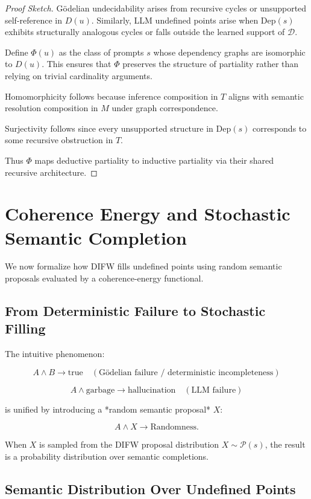 \documentclass{article}
\begin{document}
\begin{proof}[Proof Sketch]
Gödelian undecidability arises from recursive cycles or unsupported
self-reference in $D(u)$.  
Similarly, LLM undefined points arise when $\mathrm{Dep}(s)$ exhibits
structurally analogous cycles or falls outside the learned support of
$\mathcal{D}$.

Define $\Phi(u)$ as the class of prompts $s$ whose dependency graphs
are isomorphic to $D(u)$.  
This ensures that $\Phi$ preserves the structure of partiality rather
than relying on trivial cardinality arguments.

Homomorphicity follows because inference composition in $T$ aligns with
semantic resolution composition in $M$ under graph correspondence.

Surjectivity follows since every unsupported structure in
$\mathrm{Dep}(s)$ corresponds to some recursive obstruction in $T$.

Thus $\Phi$ maps deductive partiality to inductive partiality via their
shared recursive architecture.
\end{proof}

\section{Coherence Energy and Stochastic Semantic Completion}

We now formalize how DIFW fills undefined points using random semantic
proposals evaluated by a coherence-energy functional.

\subsection{From Deterministic Failure to Stochastic Filling}

The intuitive phenomenon:

\[
A \wedge B \to \text{true} 
\quad(\text{Gödelian failure / deterministic incompleteness})
\]

\[
A \wedge \text{garbage} \to \text{hallucination}
\quad(\text{LLM failure})
\]

is unified by introducing a *random semantic proposal* $X$:

\[
A \wedge X \to \text{Randomness}.
\]

When $X$ is sampled from the DIFW proposal distribution
$X \sim \mathcal{P}(s)$, the result is a probability distribution over
semantic completions.

\subsection{Semantic Distribution Over Undefined Points}
\end{document}
